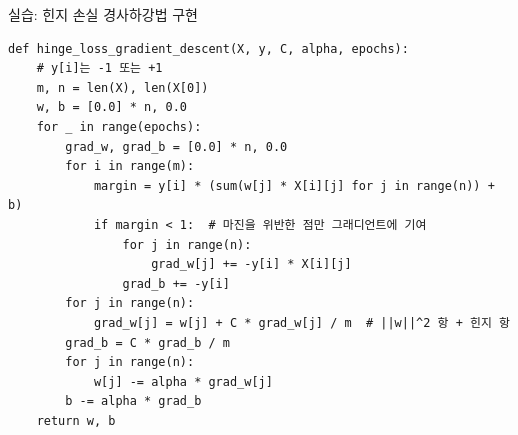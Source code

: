 \documentclass[aspectratio=169,11pt]{beamer}
\begin{document}
\begin{frame}[fragile]{실습: 힌지 손실 경사하강법 구현}
  \begin{lstlisting}
def hinge_loss_gradient_descent(X, y, C, alpha, epochs):
    # y[i]는 -1 또는 +1
    m, n = len(X), len(X[0])
    w, b = [0.0] * n, 0.0
    for _ in range(epochs):
        grad_w, grad_b = [0.0] * n, 0.0
        for i in range(m):
            margin = y[i] * (sum(w[j] * X[i][j] for j in range(n)) + b)
            if margin < 1:  # 마진을 위반한 점만 그래디언트에 기여
                for j in range(n):
                    grad_w[j] += -y[i] * X[i][j]
                grad_b += -y[i]
        for j in range(n):
            grad_w[j] = w[j] + C * grad_w[j] / m  # ||w||^2 항 + 힌지 항
        grad_b = C * grad_b / m
        for j in range(n):
            w[j] -= alpha * grad_w[j]
        b -= alpha * grad_b
    return w, b
\end{lstlisting}
\end{frame}

\end{document}

